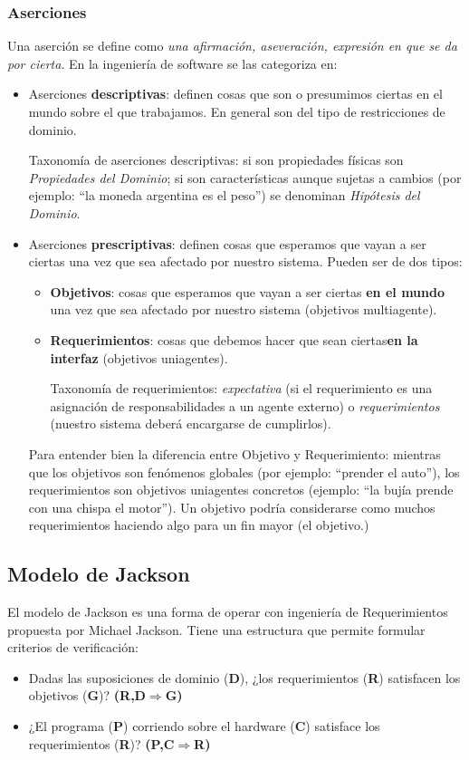 \documentclass[]{article}
\begin{document}
\subsubsection{Aserciones}
Una aserción se define como \textit{una afirmación, aseveración, expresión en que se da por cierta}. En la ingeniería de software se las categoriza en:
\begin{itemize}
	\item Aserciones \textbf{descriptivas}: definen cosas que son o presumimos ciertas en el mundo sobre el que trabajamos. En general son del tipo de restricciones de dominio.

Taxonomía de aserciones descriptivas: si son propiedades físicas son \emph{Propiedades del Dominio}; si son características aunque sujetas a cambios (por ejemplo: ``la moneda argentina es el peso'') se denominan \emph{Hipótesis del Dominio}.

	\item Aserciones \textbf{prescriptivas}: definen cosas que esperamos que vayan a ser ciertas una vez que sea afectado por nuestro sistema. Pueden ser de dos tipos:
	\begin{itemize}
		\item \textbf{Objetivos}: cosas que esperamos que vayan a ser ciertas \textbf{en el mundo} una vez que sea afectado por nuestro sistema (objetivos multiagente).
		\item \textbf{Requerimientos}: cosas que debemos hacer que sean ciertas\textbf{en la interfaz} (objetivos uniagentes).

Taxonomía de requerimientos: \emph{expectativa} (si el requerimiento es una asignación de responsabilidades a un agente externo) o \emph{requerimientos} (nuestro sistema deberá encargarse de cumplirlos).
	\end{itemize}

Para entender bien la diferencia entre Objetivo y Requerimiento: mientras que los objetivos son fenómenos globales (por ejemplo: ``prender el auto''), los requerimientos son objetivos uniagentes concretos (ejemplo: ``la bujía prende con una chispa el motor''). Un objetivo podría considerarse como muchos requerimientos haciendo algo para un fin mayor (el objetivo.)
\end{itemize}

\subsection{Modelo de Jackson}
El modelo de Jackson es una forma de operar con ingeniería de Requerimientos propuesta por Michael Jackson. Tiene una estructura que permite formular criterios de verificación:
\begin{itemize}
	\item Dadas las suposiciones de dominio (\textbf{D}), ¿los requerimientos (\textbf{R}) satisfacen los objetivos (\textbf{G})? \textbf{(R,D$\Rightarrow$G)}
	\item ¿El programa (\textbf{P}) corriendo sobre el hardware (\textbf{C}) satisface los requerimientos (\textbf{R})? \textbf{(P,C$\Rightarrow$R)}
\end{itemize}
\end{document}
